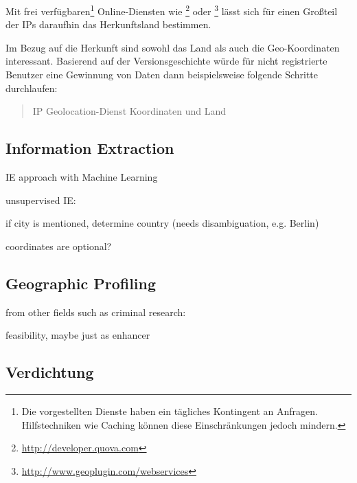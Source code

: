 Mit frei verfügbaren\footnote{Die vorgestellten Dienste haben ein tägliches Kontingent an Anfragen. Hilfstechniken wie Caching können diese Einschränkungen jedoch mindern.} Online-Diensten wie \footnote{\url{http://developer.quova.com}} oder \footnote{\url{http://www.geoplugin.com/webservices}} lässt sich für einen Großteil der IPs daraufhin das Herkunftsland bestimmen.

Im Bezug auf die Herkunft sind sowohl das Land als auch die Geo-Koordinaten interessant.  
Basierend auf der Versionsgeschichte würde für nicht registrierte Benutzer eine Gewinnung von Daten dann beispielsweise folgende Schritte durchlaufen:

\begin{quotation}
IP \RA Geolocation-Dienst \RA Koordinaten und Land
\end{quotation}


\subsection{Information Extraction}

\begin{todos}
    \item IE approach with Machine Learning 
    \item unsupervised IE: 
    \item if city is mentioned, determine country (needs disambiguation, e.g. Berlin)
    \item coordinates are optional?
\end{todos}


\subsection{Geographic Profiling}

\begin{todos}
    \item {}
    \item {}
    \item from other fields such as criminal research: \\ 
    \item feasibility, maybe just as enhancer
\end{todos}


\subsection{Verdichtung}

